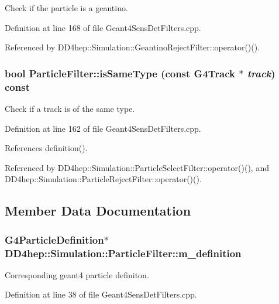 Check if the particle is a geantino. 

Definition at line 168 of file Geant4SensDetFilters.cpp.

Referenced by DD4hep::Simulation::GeantinoRejectFilter::operator()().\hypertarget{struct_d_d4hep_1_1_simulation_1_1_particle_filter_ae8f08435c7579f91364e51fe5c991b6f}{
\subsubsection[{isSameType}]{\setlength{\rightskip}{0pt plus 5cm}bool ParticleFilter::isSameType (const G4Track $\ast$ {\em track}) const}}
\label{struct_d_d4hep_1_1_simulation_1_1_particle_filter_ae8f08435c7579f91364e51fe5c991b6f}


Check if a track is of the same type. 

Definition at line 162 of file Geant4SensDetFilters.cpp.

References definition().

Referenced by DD4hep::Simulation::ParticleSelectFilter::operator()(), and DD4hep::Simulation::ParticleRejectFilter::operator()().

\subsection{Member Data Documentation}
\hypertarget{struct_d_d4hep_1_1_simulation_1_1_particle_filter_ae3cc90b48466de4f0a7d38544db44024}{
\subsubsection[{m\_\-definition}]{\setlength{\rightskip}{0pt plus 5cm}G4ParticleDefinition$\ast$ {\bf DD4hep::Simulation::ParticleFilter::m\_\-definition}}}
\label{struct_d_d4hep_1_1_simulation_1_1_particle_filter_ae3cc90b48466de4f0a7d38544db44024}


Corresponding geant4 particle definiton. 

Definition at line 38 of file Geant4SensDetFilters.cpp.

